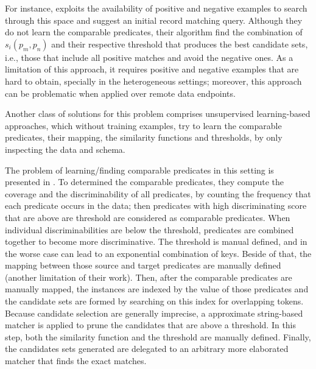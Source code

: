 For instance,\cite{DBLP:conf/vldb/ChaudhuriCGK07} exploits the availability of positive and negative examples to search through this space and suggest an initial record matching query. Although they do not learn the comparable predicates, their algorithm find the combination of $s_i(p_m,p_n)$ and their respective threshold that produces the best candidate sets, i.e., those that include all positive matches and avoid the negative ones. As a limitation of this approach,  it requires positive and negative examples that are hard to obtain, specially in the heterogeneous settings; moreover, this approach can be problematic when applied over remote data endpoints.
 
Another class of solutions for this problem comprises unsupervised learning-based approaches, which without training examples, try to learn the comparable predicates, their mapping, the similarity functions and thresholds, by only inspecting the data and schema.

 
The problem of learning/finding comparable predicates in this setting is presented in \cite{DBLP:conf/semweb/SongH11}. To determined the comparable predicates, they compute the coverage and the discriminability of all predicates, by counting the frequency that each predicate occurs in the data; then predicates with high discriminating score that are above are threshold are considered as comparable predicates. When individual discriminabilities are below the threshold, predicates are combined together to become more discriminative. The threshold is manual defined, and in the worse case can lead to an exponential combination of keys. Beside of that, the mapping between those source and target predicates are manually defined (another limitation of their work). Then, after the comparable predicates are manually mapped, the instances are indexed by the value of those predicates and the candidate sets are formed by searching on this index for overlapping tokens. Because candidate selection are generally imprecise, a approximate string-based matcher is applied to prune the candidates that are above a threshold. In this step, both the similarity function and the threshold are manually defined. Finally, the candidates sets generated are delegated to an arbitrary more elaborated matcher that finds the exact matches. 

